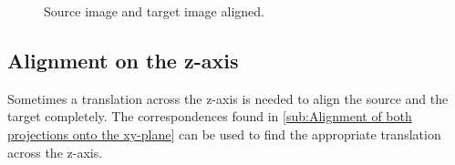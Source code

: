             \begin{figure}[htp]
                \centering
                \caption{Source image and target image aligned.}
                \label{fig:2D_aligned}
            \end{figure}
        \subsection{Alignment on the z-axis}
            Sometimes a translation across the z-axis is needed to align the source and the target completely.
            The correspondences found in \autoref{sub:Alignment of both projections onto the xy-plane} 
            can be used to find the appropriate translation across the z-axis.

